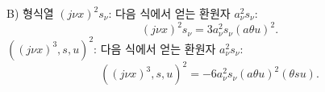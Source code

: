 
B) 형식열 $(j\nu x)^2s_\nu$: 다음 식에서 얻는 환원자 $a_\nu^2s_\nu$:
\[
(j\nu x)^2s_\nu=3a_\nu^2s_\nu(a\theta u)^2.
\]
$((j\nu x)^3,s,u)^2$: 다음 식에서 얻는 환원자 $a_\nu^2s_\nu$:
\[
((j\nu x)^3,s,u)^2=-6a_\nu^2s_\nu(a\theta u)^2(\theta su).
\]
